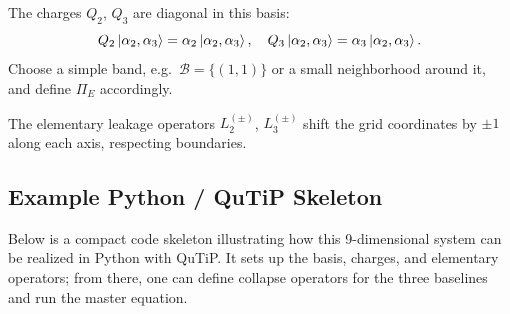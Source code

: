 \documentclass[11pt]{article}
\begin{document}
The charges $Q_2$, $Q_3$ are diagonal in this basis:
\begin{equation}
  Q_2 \ket{\alpha_2,\alpha_3} = \alpha_2 \ket{\alpha_2,\alpha_3}, \quad
  Q_3 \ket{\alpha_2,\alpha_3} = \alpha_3 \ket{\alpha_2,\alpha_3}.
\end{equation}
Choose a simple band, e.g.\ $\mathcal B=\{(1,1)\}$ or a small neighborhood
around it, and define $\Pi_E$ accordingly.

The elementary leakage operators $L_2^{(\pm)}$, $L_3^{(\pm)}$ shift the grid
coordinates by $\pm 1$ along each axis, respecting boundaries.

\subsection{Example Python / QuTiP Skeleton}

Below is a compact code skeleton illustrating how this 9-dimensional system
can be realized in Python with QuTiP. It sets up the basis, charges, and
elementary operators; from there, one can define collapse operators for the
three baselines and run the master equation.
\end{document}
